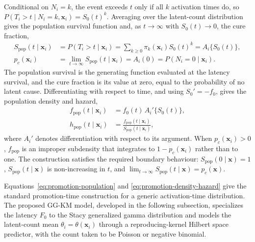 {Conditional on $N_i=k$, the event exceeds $t$ only if all $k$ activation times do, so $P(T_i>t\mid N_i=k,\bm{x}_i)=S_0(t)^k$. Averaging over the latent-count distribution gives the population survival function and, as $t\to\infty$ with $S_0(t)\to0$, the cure fraction,
\begin{equation}
\begin{aligned}
S_{\mathrm{pop}}(t\mid\bm{x}_i)
&=P(T_i>t\mid\bm{x}_i)
=\sum_{k\ge0}\pi_k(\bm{x}_i)S_0(t)^k
=A_i\{S_0(t)\},\\
p_c(\bm{x}_i)
&=\lim_{t\to\infty}S_{\mathrm{pop}}(t\mid\bm{x}_i)
=A_i(0)=P(N_i=0\mid\bm{x}_i).
\end{aligned}
\label{eq:promotion-population}
\end{equation}
The population survival is the generating function evaluated at the latency survival, and the cure fraction is its value at zero, equal to the probability of no latent cause. Differentiating with respect to time, and using $S_0'=-f_0$, gives the population density and hazard,
\begin{equation}
\begin{aligned}
f_{\mathrm{pop}}(t\mid\bm{x}_i)
&=f_0(t)\,A_i'\{S_0(t)\},\\
h_{\mathrm{pop}}(t\mid\bm{x}_i)
&=\frac{f_{\mathrm{pop}}(t\mid\bm{x}_i)}
        {S_{\mathrm{pop}}(t\mid\bm{x}_i)},
\end{aligned}
\label{eq:promotion-density-hazard}
\end{equation}
where $A_i'$ denotes differentiation with respect to its argument. When $p_c(\bm{x}_i)>0$, $f_{\mathrm{pop}}$ is an improper subdensity that integrates to $1-p_c(\bm{x}_i)$ rather than to one. The construction satisfies the required boundary behaviour: $S_{\mathrm{pop}}(0\mid\bm{x})=1$, $S_{\mathrm{pop}}(t\mid\bm{x})$ is non-increasing in $t$, and $\lim_{t\to\infty}S_{\mathrm{pop}}(t\mid\bm{x})=p_c(\bm{x})$. %

Equations~\eqref{eq:promotion-population} and \eqref{eq:promotion-density-hazard} give the standard promotion-time construction for a generic activation-time distribution. The proposed GG-KM model, developed in the following subsection, specializes the latency $F_0$ to the Stacy generalized gamma distribution and models the latent-count mean $\theta_i=\theta(\bm{x}_i)$ through a reproducing-kernel Hilbert space predictor, with the count taken to be Poisson or negative binomial.}

